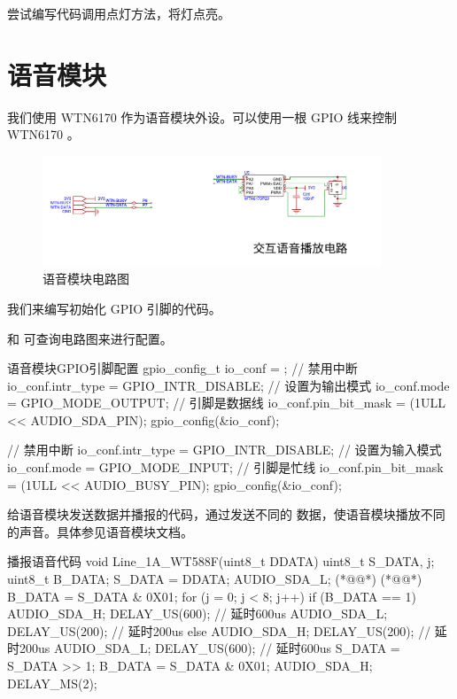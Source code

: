 \documentclass[lang=cn,newtx,10pt,scheme=chinese]{elegantbook}
\begin{document}
尝试编写代码调用点灯方法，将灯点亮。

\chapter{语音模块}

我们使用 WTN6170 作为语音模块外设。可以使用一根 GPIO 线来控制 WTN6170 。

\begin{figure}[!htb]
\centering
\includegraphics[width=0.9\textwidth]{WTN6170.png}
\caption{语音模块电路图}
\end{figure}

我们来编写初始化 GPIO 引脚的代码。

 和  可查询电路图来进行配置。

\begin{mycode}{语音模块GPIO引脚配置}
gpio_config_t io_conf = {};
// 禁用中断
io_conf.intr_type = GPIO_INTR_DISABLE;
// 设置为输出模式
io_conf.mode = GPIO_MODE_OUTPUT;
// 引脚是数据线
io_conf.pin_bit_mask = (1ULL << AUDIO_SDA_PIN);
gpio_config(&io_conf);

// 禁用中断
io_conf.intr_type = GPIO_INTR_DISABLE;
// 设置为输入模式
io_conf.mode = GPIO_MODE_INPUT;
// 引脚是忙线
io_conf.pin_bit_mask = (1ULL << AUDIO_BUSY_PIN);
gpio_config(&io_conf);
\end{mycode}

给语音模块发送数据并播报的代码，通过发送不同的  数据，使语音模块播放不同的声音。具体参见语音模块文档。

\begin{mycode}{播报语音代码}
void Line_1A_WT588F(uint8_t DDATA)
{
    uint8_t S_DATA, j;
    uint8_t B_DATA;
    S_DATA = DDATA;
    AUDIO_SDA_L;
    (*@@*) (*@@*)
    B_DATA = S_DATA & 0X01;
    for (j = 0; j < 8; j++)
    {
        if (B_DATA == 1)
        {
            AUDIO_SDA_H;
            DELAY_US(600); // 延时600us
            AUDIO_SDA_L;
            DELAY_US(200); // 延时200us
        }
        else
        {
            AUDIO_SDA_H;
            DELAY_US(200); // 延时200us
            AUDIO_SDA_L;
            DELAY_US(600); // 延时600us
        }
        S_DATA = S_DATA >> 1;
        B_DATA = S_DATA & 0X01;
    }
    AUDIO_SDA_H;
    DELAY_MS(2);
}
\end{mycode}
\end{document}
